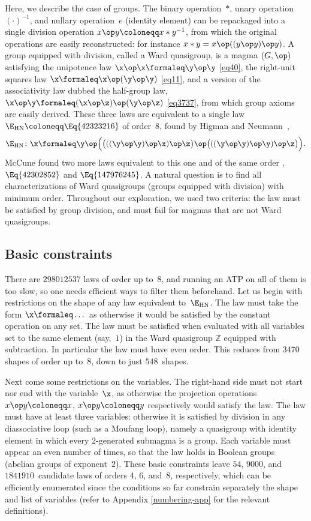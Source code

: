 Here, we describe the case of groups.  The binary operation~$*$, unary operation~$(\cdot )^{-1}$, and nullary operation~$e$ (identity element) can be repackaged into a single division operation $x \op y \coloneqq x*y^{-1}$, from which the original operations are easily reconstructed: for instance $x*y=x\op((y\op y)\op y)$.  A group equipped with division, called a Ward quasigroup, is a magma $(G, \op)$ satisfying the unipotence law $\x \op \x \formaleq \y \op \y$ \eqref{eq40}, the right-unit squares law $\x \formaleq \x \op (\y \op \y)$ \eqref{eq11}, and a version of the associativity law dubbed the half-group law, $\x \op \y \formaleq (\x \op \z) \op (\y \op \z)$ \eqref{eq3737}, from which group axioms are easily derived.
These three laws are equivalent to a single law $\E_{\mathrm{HN}}\coloneqq \Eq{42323216}$ of order~$8$, found by Higman and Neumann~\cite{higman-neumann},
\[
\E_{\mathrm{HN}} \colon \x \formaleq \y \op \Bigl(\bigl(((\y \op \y) \op \x) \op \z\bigr) \op \bigl(((\y \op \y) \op \y) \op \z\bigr)\Bigr) .
\]
McCune found two more laws equivalent to this one and of the same order \cite{mccune1993single}, $\Eq{42302852}$ and $\Eq{147976245}$.  A natural question is to find all characterizations of Ward quasigroups (groups equipped with division) with minimum order.
Throughout our exploration, we used two criteria: the law must be satisfied by group division, and must fail for magmas that are not Ward quasigroups.

\subsection{Basic constraints}

There are $\num{298012537}$ laws of order up to~$8$, and running an ATP on all of them is too slow, so one needs efficient ways to filter them beforehand.  Let us begin with restrictions on the shape of any law equivalent to~$\E_{\mathrm{HN}}$.
The law must take the form $\x\formaleq\dots$ as otherwise it would be satisfied by the constant operation on any set.
The law must be satisfied when evaluated with all variables set to the same element (say,~$1$) in the Ward quasigroup $\mathbb{Z}$ equipped with subtraction.  In particular the law must have even order.
This reduces from $\num{3470}$ shapes of order up to~$8$, down to just $548$~shapes.

Next come some restrictions on the variables.
The right-hand side must not start nor end with the variable~$\x$, as otherwise the projection operations $x\op y \coloneqq x$, $x\op y\coloneqq y$ respectively would satisfy the law.
The law must have at least three variables: otherwise it is satisfied by division in any diassociative loop (such as a Moufang loop), namely a quasigroup with identity element in which every $2$-generated submagma is a group.
Each variable must appear an even number of times, so that the law holds in Boolean groups (abelian groups of exponent~$2$).
These basic constraints leave $54$, $\num{9000}$, and $\num{1841910}$~candidate laws of orders $4$, $6$, and~$8$, respectively, which can be efficiently enumerated since the conditions so far constrain separately the shape and list of variables (refer to Appendix \ref{numbering-app} for the relevant definitions).

